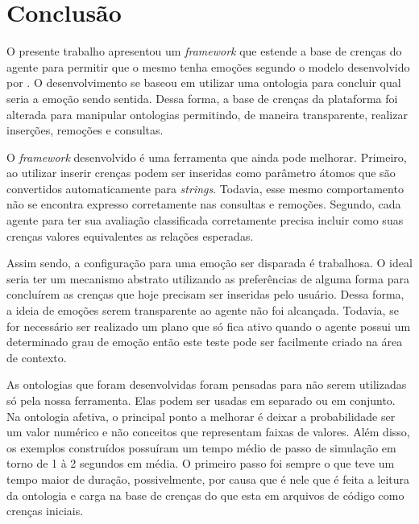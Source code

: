 \chapter{Conclusão} \label{ch:cf}

O presente trabalho apresentou um \emph{framework} que estende a base de
crenças do agente \jason para permitir que o mesmo tenha emoções segundo o
modelo desenvolvido por \citet{ortony1988cse}. O desenvolvimento se baseou em
utilizar uma ontologia para concluir qual seria a emoção sendo sentida. Dessa
forma, a base de crenças da plataforma foi alterada para manipular ontologias
permitindo, de maneira transparente, realizar inserções, remoções e consultas.

O \emph{framework} desenvolvido é uma ferramenta que ainda pode melhorar.
Primeiro, ao utilizar inserir crenças podem ser inseridas como parâmetro
átomos que são convertidos automaticamente para \emph{strings}. Todavia, esse
mesmo comportamento não se encontra expresso corretamente nas consultas e
remoções. Segundo, cada agente para ter sua avaliação classificada
corretamente precisa incluir como suas crenças valores equivalentes as
relações esperadas.

Assim sendo, a configuração para uma emoção ser disparada é trabalhosa. O
ideal seria ter um mecanismo abstrato utilizando as preferências de alguma
forma para concluírem as crenças que hoje precisam ser inseridas pelo usuário.
Dessa forma, a ideia de emoções serem transparente ao agente não foi
alcançada. Todavia, se for necessário ser realizado um plano que só fica
ativo quando o agente possui um determinado grau de emoção então este teste
pode ser facilmente criado na área de contexto.


As ontologias que foram desenvolvidas foram pensadas para não serem utilizadas
só pela nossa ferramenta. Elas podem ser usadas em separado ou em conjunto. Na
ontologia afetiva, o principal ponto a melhorar é deixar a probabilidade ser
um valor numérico e não conceitos que representam faixas de valores.
%
Além disso, os exemplos construídos possuíram um tempo médio de passo de
simulação em torno de 1 à 2 segundos em média. O primeiro passo foi sempre o
que teve um tempo maior de duração, possivelmente, por causa que é nele que é
feita a leitura da ontologia e carga na base de crenças do que esta em
arquivos de código \jason como crenças iniciais.


